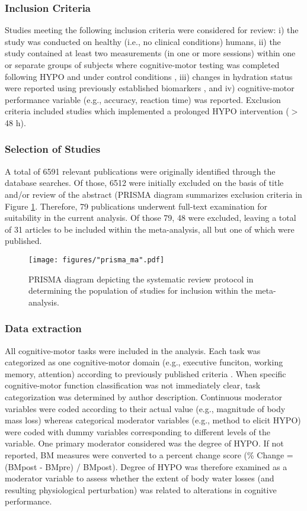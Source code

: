 \subsubsection{Inclusion Criteria}
Studies meeting the following inclusion criteria were considered for review: i) the study was conducted on healthy (i.e., no clinical conditions) humans, ii) the study contained at least two measurements (in one or more sessions) within one or separate  groups of subjects where cognitive-motor testing was completed following HYPO and under control conditions , iii) changes in hydration status were reported using previously established biomarkers \cite{cheuvront_physiologic_2013}, and iv) cognitive-motor performance variable (e.g., accuracy, reaction time) was reported. Exclusion criteria included studies which implemented a prolonged HYPO intervention (${>}$ 48 h).     

\subsubsection{Selection of Studies}
A total of 6591 relevant publications were originally identified through the database searches. Of those, 6512 were initially excluded on the basis of title and/or review of the abstract (PRISMA diagram summarizes exclusion criteria in Figure \ref{fig:prisma}. Therefore, 79 publications underwent full-text examination for suitability in the current analysis. Of those 79, 48 were excluded, leaving a total of 31 articles to be included within the meta-analysis, all but one \cite{kakos_improving_2013} of which were published.

\begin{figure}
  	\centering
  	\texttt{[image: figures/"prisma\_ma".pdf]}
  	\caption{PRISMA diagram depicting the systematic review protocol in determining the population of studies for inclusion within the meta-analysis.}
  	\label{fig:prisma}

\end{figure}

\subsubsection{Data extraction}
All cognitive-motor tasks were included in the analysis. Each task was categorized as one cognitive-motor domain (e.g., executive funciton, working memory, attention) according to previously published criteria \cite{chang_effects_2012}. When specific cognitive-motor function classification was not immediately clear,  task categorization was determined by  author description. Continuous moderator variables were coded according to their actual value (e.g., magnitude of body mass loss) whereas categorical moderator variables (e.g., method to elicit HYPO) were coded with dummy variables corresponding to different levels of the variable. One primary moderator considered was the degree of HYPO. If not reported, BM measures were converted to a percent change score (\% Change = (BMpost - BMpre) / BMpost). Degree of HYPO was therefore examined as a moderator variable to assess whether the extent of body water losses (and resulting physiological perturbation) was related to alterations in cognitive performance. 

